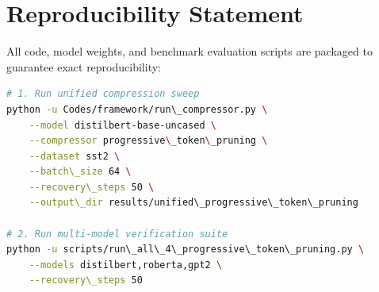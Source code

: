 \section{Reproducibility Statement}
All code, model weights, and benchmark evaluation scripts are packaged to guarantee exact reproducibility:
\begin{lstlisting}[language=bash]
# 1. Run unified compression sweep
python -u Codes/framework/run\_compressor.py \
    --model distilbert-base-uncased \
    --compressor progressive\_token\_pruning \
    --dataset sst2 \
    --batch\_size 64 \
    --recovery\_steps 50 \
    --output\_dir results/unified\_progressive\_token\_pruning

# 2. Run multi-model verification suite
python -u scripts/run\_all\_4\_progressive\_token\_pruning.py \
    --models distilbert,roberta,gpt2 \
    --recovery\_steps 50
\end{lstlisting}
